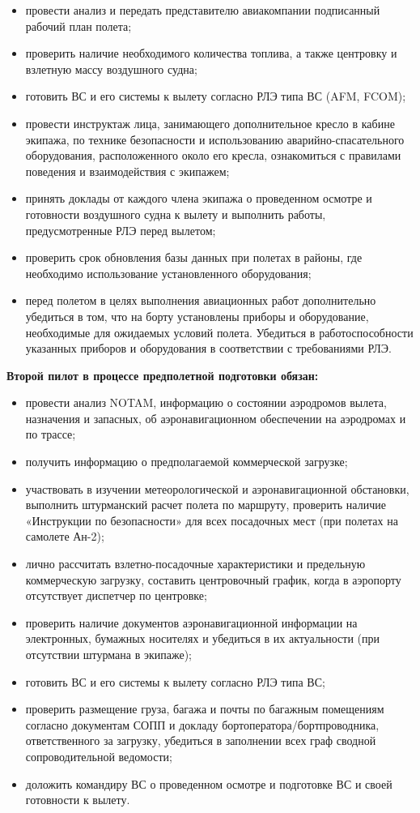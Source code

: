 \begin{itemize}
    \item провести анализ и передать представителю авиакомпании подписанный рабочий план полета;
    \item проверить наличие необходимого количества топлива, а также центровку и взлетную массу воздушного судна;
    \item готовить ВС и его системы к вылету согласно РЛЭ типа ВС (AFM, FCOM);
    \item провести инструктаж лица, занимающего дополнительное кресло в кабине экипажа, по технике безопасности и использованию аварийно-спасательного оборудования, расположенного около его кресла, ознакомиться с правилами поведения и взаимодействия с экипажем;
    \item принять доклады от каждого члена экипажа о проведенном осмотре и готовности воздушного судна к вылету и выполнить работы, предусмотренные РЛЭ перед вылетом;
    \item проверить срок обновления базы данных при полетах в районы, где необходимо использование  
установленного оборудования; 
\item перед полетом в целях выполнения авиационных работ дополнительно убедиться в том, что на борту установлены приборы и оборудование, необходимые для ожидаемых условий полета. Убедиться в работоспособности указанных приборов и оборудования в соответствии с требованиями РЛЭ.
\end{itemize}


\textbf{Второй пилот в процессе предполетной подготовки обязан:} 
\begin{itemize}
    \item провести анализ NOTAM, информацию о состоянии аэродромов вылета, назначения и запасных, об аэронавигационном обеспечении на аэродромах и по трассе; 
    \item получить информацию о предполагаемой коммерческой загрузке; 
    \item участвовать в изучении метеорологической и аэронавигационной обстановки, выполнить штурманский расчет полета по маршруту, проверить наличие «Инструкции по безопасности» для всех посадочных мест (при полетах на самолете Ан-2); 
    \item лично рассчитать взлетно-посадочные характеристики и предельную коммерческую загрузку, составить центровочный график, когда в аэропорту отсутствует диспетчер по центровке; 
    \item проверить наличие документов аэронавигационной информации на электронных, бумажных носителях и убедиться в их актуальности (при отсутствии штурмана в экипаже);
    \item готовить ВС и его системы к вылету согласно РЛЭ типа ВС; 
    \item проверить размещение груза, багажа и почты по багажным помещениям согласно документам СОПП и докладу бортоператора/бортпроводника, ответственного за загрузку, убедиться в заполнении всех граф сводной сопроводительной ведомости; 
    \item доложить командиру ВС о проведенном осмотре и подготовке ВС и своей готовности к вылету.
\end{itemize}

